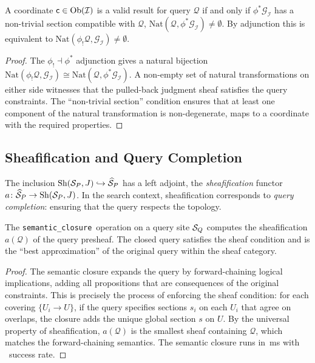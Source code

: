 \documentclass[11pt]{article}
\newcommand{\SemanticClosure}{\texttt{semantic\_closure}}
\newcommand{\SemIndex}{\mathcal{I}}
\newcommand{\QuerySheaf}{\mathcal{Q}}
\newcommand{\Presh}{\widehat{\Site}}                 %
\newcommand{\Nat}{\mathrm{Nat}}                     %
\newcommand{\Sh}{\mathrm{Sh}}                       %
\begin{document}
\begin{proposition}\label{prop:search-adjunction}
A coordinate $\coord \in \Ob(\SemIndex)$ is a valid result for query
$\QuerySheaf$ if and only if $\phi^{*}\mathcal{G}_{\SemIndex}$ has a
non-trivial section compatible with $\QuerySheaf$, \ie
$\Nat(\QuerySheaf, \phi^{*}\mathcal{G}_{\SemIndex}) \neq \emptyset$.
By adjunction this is equivalent to
$\Nat(\phi_{!}\QuerySheaf, \mathcal{G}_{\SemIndex}) \neq \emptyset$.
\end{proposition}

\begin{proof}
The $\phi_{!} \dashv \phi^{*}$ adjunction gives a natural bijection
$\Nat(\phi_{!}\QuerySheaf, \mathcal{G}_{\SemIndex}) \cong
\Nat(\QuerySheaf, \phi^{*}\mathcal{G}_{\SemIndex})$.  A non-empty
set of natural transformations on either side witnesses that the pulled-back
judgment sheaf satisfies the query constraints.  The ``non-trivial
section'' condition ensures that at least one component of the natural
transformation is non-degenerate, \ie maps to a coordinate with the
required properties.
\end{proof}

\subsection{Sheafification and Query Completion}

The inclusion $\Sh(\Site_P, J) \hookrightarrow \Presh_P$ has a left
adjoint, the \emph{sheafification} functor $a \colon \Presh_P \to
\Sh(\Site_P, J)$.  In the search context, sheafification corresponds to
\emph{query completion}: ensuring that the query respects the topology.

\begin{proposition}\label{prop:closure-sheafification}
The \SemanticClosure\ operation on a query site $\mathcal{S}_Q$ computes the
sheafification $a(\QuerySheaf)$ of the query presheaf.  The closed
query satisfies the sheaf condition and is the ``best approximation''
of the original query within the sheaf category.
\end{proposition}

\begin{proof}
The semantic closure expands the query by forward-chaining logical
implications, adding all propositions that are consequences of the
original constraints.  This is precisely the process of enforcing the
sheaf condition: for each covering $\{U_i \to U\}$, if the query
specifies sections $s_i$ on each $U_i$ that agree on overlaps, the
closure adds the unique global section $s$ on $U$.  By the universal
property of sheafification, $a(\QuerySheaf)$ is the smallest sheaf
containing $\QuerySheaf$, which matches the forward-chaining semantics.
The semantic closure runs in \compProfSemanticClosureMeanMs\,ms with
\compProfSemanticClosureRate\ success rate.
\end{proof}
\end{document}
